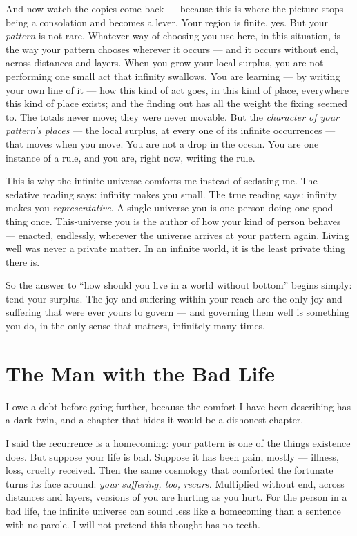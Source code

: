 \documentclass[fontsize=11pt,paper=a4,pagesize=auto,parskip=half-]{scrbook}
\begin{document}
And now watch the copies come back --- because this is where the picture stops being a consolation and becomes a lever. Your region is finite, yes. But your \emph{pattern} is not rare. Whatever way of choosing you use here, in this situation, is the way your pattern chooses wherever it occurs --- and it occurs without end, across distances and layers. When you grow your local surplus, you are not performing one small act that infinity swallows. You are learning --- by writing your own line of it --- how this kind of act goes, in this kind of place, everywhere this kind of place exists; and the finding out has all the weight the fixing seemed to. The totals never move; they were never movable. But the \emph{character of your pattern's places} --- the local surplus, at every one of its infinite occurrences --- that moves when you move. You are not a drop in the ocean. You are one instance of a rule, and you are, right now, writing the rule.

This is why the infinite universe comforts me instead of sedating me. The sedative reading says: infinity makes you small. The true reading says: infinity makes you \emph{representative}. A single-universe you is one person doing one good thing once. This-universe you is the author of how your kind of person behaves --- enacted, endlessly, wherever the universe arrives at your pattern again. Living well was never a private matter. In an infinite world, it is the least private thing there is.

So the answer to ``how should you live in a world without bottom'' begins simply: tend your surplus. The joy and suffering within your reach are the only joy and suffering that were ever yours to govern --- and governing them well is something you do, in the only sense that matters, infinitely many times.

\section{The Man with the Bad Life}

I owe a debt before going further, because the comfort I have been describing has a dark twin, and a chapter that hides it would be a dishonest chapter.

I said the recurrence is a homecoming: your pattern is one of the things existence does. But suppose your life is bad. Suppose it has been pain, mostly --- illness, loss, cruelty received. Then the same cosmology that comforted the fortunate turns its face around: \emph{your suffering, too, recurs.} Multiplied without end, across distances and layers, versions of you are hurting as you hurt. For the person in a bad life, the infinite universe can sound less like a homecoming than a sentence with no parole. I will not pretend this thought has no teeth.
\end{document}
